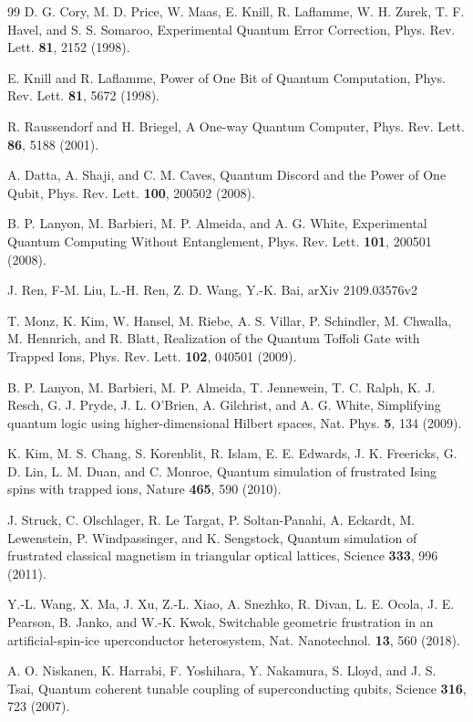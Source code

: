 \documentclass[pra,aps,twocolumn,showpacs]{revtex4}
\begin{document}
\begin{thebibliography}{99}
   D. G. Cory, M. D. Price, W. Maas, E. Knill, R. Laflamme, W. H. Zurek, T. F. Havel, and S. S. Somaroo, Experimental Quantum Error Correction, Phys. Rev. Lett. \textbf{81}, 2152 (1998).

  E. Knill and R. Laflamme, Power of One Bit of Quantum Computation, Phys. Rev. Lett. \textbf{81}, 5672 (1998).

   R. Raussendorf and H. Briegel, A One-way Quantum Computer, Phys. Rev. Lett. \textbf{86}, 5188 (2001).

 A. Datta, A. Shaji, and C. M. Caves, Quantum Discord and the Power of One Qubit, Phys. Rev. Lett. \textbf{100}, 200502 (2008).

 B. P. Lanyon, M. Barbieri, M. P. Almeida,  and A. G. White, Experimental Quantum Computing Without Entanglement, Phys. Rev. Lett. \textbf{101}, 200501 (2008).

 J. Ren, F-M. Liu, L.-H. Ren, Z. D. Wang, Y.-K. Bai, arXiv 2109.03576v2


 T. Monz, K. Kim, W. Hansel, M. Riebe, A. S. Villar, P. Schindler, M. Chwalla, M. Hennrich, and R. Blatt, Realization of the Quantum Toffoli Gate with Trapped Ions, Phys. Rev. Lett. \textbf{102}, 040501 (2009).
	
 B. P. Lanyon, M. Barbieri, M. P. Almeida, T. Jennewein, T. C. Ralph, K. J. Resch, G. J. Pryde, J. L. O'Brien, A. Gilchrist, and A. G. White, Simplifying quantum logic using higher-dimensional Hilbert spaces, Nat. Phys. \textbf{5}, 134 (2009).


 K. Kim, M. S. Chang, S. Korenblit, R. Islam, E. E. Edwards, J. K. Freericks, G. D. Lin, L. M. Duan, and C. Monroe, Quantum simulation of frustrated Ising spins with trapped ions, Nature \textbf{465}, 590 (2010).
	
 J. Struck, C. Olschlager, R. Le Targat, P. Soltan-Panahi, A. Eckardt, M. Lewenstein, P. Windpassinger, and K. Sengstock, Quantum simulation of frustrated classical magnetism in triangular optical lattices, Science \textbf{333}, 996 (2011).

	Y.-L. Wang, X. Ma, J. Xu, Z.-L. Xiao, A. Snezhko, R. Divan, L. E. Ocola, J. E. Pearson, B. Janko, and W.-K. Kwok, Switchable geometric frustration in an artificial-spin-ice uperconductor heterosystem, Nat. Nanotechnol. \textbf{13}, 560 (2018).

	A. O. Niskanen, K. Harrabi, F. Yoshihara, Y. Nakamura, S. Lloyd, and J. S. Tsai, Quantum coherent tunable coupling of superconducting qubits, Science \textbf{316}, 723 (2007).
    	

\end{thebibliography}
\end{document}
